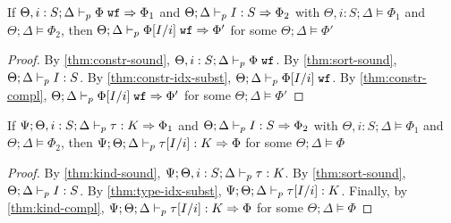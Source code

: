 \begin{theorem}
If $\Theta, i : S; \Delta \vdash_p \Phi \; \texttt{wf} \Rightarrow \Phi_1$ and $\Theta ; \Delta \vdash_p I : S \Rightarrow \Phi_2$
with $\Theta, i : S ; \Delta \vDash \Phi_1$ and $\Theta ; \Delta \vDash \Phi_2$, then
$\Theta ; \Delta \vdash_p  \Phi[I/i] \; \texttt{wf} \Rightarrow \Phi'$ for some $\Theta ; \Delta \vDash \Phi'$
\label{thm:constr-idx-algo-subst}
\end{theorem}
\begin{proof}
By \autoref{thm:constr-sound}, $\Theta, i : S ; \Delta \vdash_p \Phi \; \texttt{wf}$.
By \autoref{thm:sort-sound}, $\Theta ; \Delta \vdash_p I : S$.
By \autoref{thm:constr-idx-subst}, $\Theta ; \Delta \vdash_p \Phi[I/i] \; \texttt{wf}$.
By \autoref{thm:constr-compl}, $\Theta ; \Delta \vdash_p \Phi[I/i] \; \texttt{wf} \Rightarrow \Phi'$ for some $\Theta ; \Delta \vDash \Phi'$
\end{proof}

\begin{theorem}
If $\Psi ; \Theta, i : S ; \Delta \vdash_p \tau : K \Rightarrow \Phi_1$ and $\Theta ; \Delta \vdash_p I : S \Rightarrow \Phi_2$ 
with $\Theta, i : S ; \Delta \vDash \Phi_1$ and $\Theta ; \Delta \vDash \Phi_2$, then
$\Psi ; \Theta ; \Delta \vdash_p \tau[I/i] : K \Rightarrow \Phi$ for some $\Theta ; \Delta \vDash \Phi$
\label{thm:type-idx-algo-subst}
\end{theorem}
\begin{proof}
By \autoref{thm:kind-sound}, $\Psi ; \Theta, i : S ; \Delta \vdash_p \tau : K$.
By \autoref{thm:sort-sound}, $\Theta ; \Delta \vdash_p I : S$.
By \autoref{thm:type-idx-subst}, $\Psi ; \Theta ; \Delta \vdash_p \tau[I/i] : K$.
Finally, by \autoref{thm:kind-compl}, $\Psi ; \Theta ; \Delta \vdash_p \tau[I/i] : K \Rightarrow \Phi$ for some $\Theta ; \Delta \vDash \Phi$
\end{proof}

\subtynfidxsubst*

